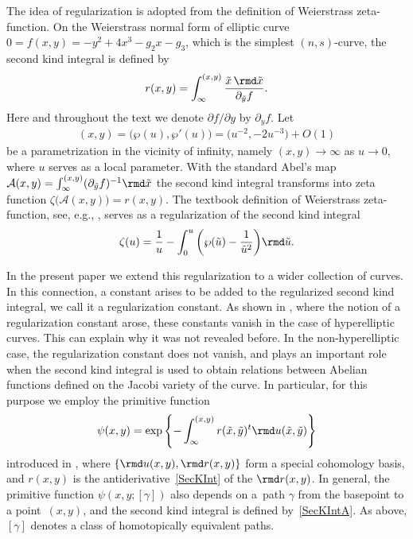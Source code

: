 The idea of regularization is adopted from the definition of Weierstrass zeta-function. On the Weierstrass normal form of elliptic curve $0=f(x,y)=-y^2 + 4x^3 - g_2 x - g_3$, which is the simplest $(n,s)$-curve, the second kind integral is defined by
\begin{gather*}
 r(x,y) = \int_{\infty}^{(x,y)} \frac{\tilde{x}\, \rmd \tilde{x}}{\partial_{\tilde{y}} f}.
\end{gather*}
Here and throughout the text we denote $\partial f/\partial y$ by $\partial_y f$. Let
\begin{gather*} (x,y)=\big(\wp(u),\wp'(u)\big)= \big(u^{-2},{-}2u^{-3}\big)+O(1)\end{gather*} be a parametrization in the vicinity of infinity, namely $(x,y)\to\infty$ as $u\to 0$, where $u$ serves as a local parameter. With the standard Abel's map $\mathcal{A}(x,y) = \int_{\infty}^{(x,y)} (\partial_{\tilde{y}} f)^{-1}\rmd \tilde{x}$ the second kind integral transforms into zeta function $\zeta \big(\mathcal{A}(x,y)\big) = r(x,y)$. The textbook definition of Weierstrass zeta-function, see, e.g., \cite[Chapter~XX, Section~20.4]{Whittaker}, serves as a regularization of the second kind integral
\begin{gather*}
 \zeta(u) = \frac{1}{u} - \int_{0}^{u} \bigg(\wp(\tilde{u}) - \frac{1}{\tilde{u}^2}\bigg) \rmd \tilde{u}.
\end{gather*}

In the present paper we extend this regularization to a wider collection of curves. In this connection, a constant arises to be added to the regularized second kind integral, we call it a regularization constant. As shown in \cite[Section~193]{BakerAF}, where the notion of a regularization constant arose, these constants vanish in the case of hyperelliptic curves. This can explain why it was not revealed before. In the non-hyperelliptic case, the regularization constant does not vanish, and plays an important role when the second kind integral is used to obtain relations between Abelian functions defined on the Jacobi variety of the curve. In particular, for this purpose we employ the primitive function
\begin{gather}\label{PsiDef0}
 \psi(x,y) = \exp\left\{-\int_{\infty}^{(x,y)} r(\tilde{x},\tilde{y})^{t} \rmd u(\tilde{x},\tilde{y}) \right\}
\end{gather}
introduced in \cite{BL2005}, where $\{\rmd u(x,y),\rmd r(x,y)\}$ form a special cohomology basis, and $r(x,y)$ is the antiderivative~\eqref{SecKInt} of the $\rmd r(x,y)$. In general, the primitive function $\psi(x,y;[\gamma])$ also depends on a~path $\gamma$ from the basepoint to a point~$(x,y)$, and the second kind integral is defined by~\eqref{SecKIntA}. As above, $[\gamma]$ denotes a class of homotopically equivalent paths.

